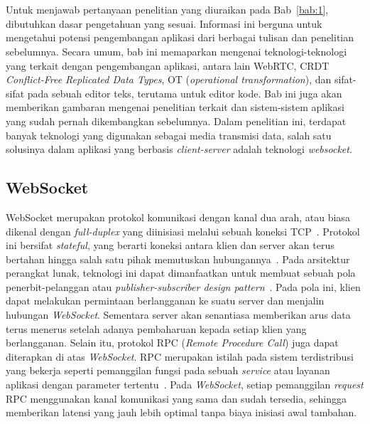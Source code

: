 \chapter{\babDua}
\label{bab:2}
Untuk menjawab pertanyaan penelitian yang diuraikan pada Bab~\ref{bab:1}, dibutuhkan dasar pengetahuan yang sesuai. Informasi ini berguna untuk mengetahui potensi pengembangan aplikasi dari berbagai tulisan dan penelitian sebelumnya. Secara umum, bab ini memaparkan mengenai teknologi-teknologi yang terkait dengan pengembangan aplikasi, antara lain WebRTC, CRDT \textit{Conflict-Free Replicated Data Types}, OT (\textit{operational transformation}), dan sifat-sifat pada sebuah editor teks, terutama untuk editor kode. Bab ini juga akan memberikan gambaran mengenai penelitian terkait dan sistem-sistem aplikasi yang sudah pernah dikembangkan sebelumnya. Dalam penelitian ini, terdapat banyak teknologi yang digunakan sebagai media transmisi data, salah satu solusinya dalam aplikasi yang berbasis \textit{client-server} adalah teknologi \textit{websocket}.

\section{WebSocket}

WebSocket merupakan protokol komunikasi dengan kanal dua arah, atau biasa dikenal dengan \textit{full-duplex} yang diinisiasi melalui sebuah koneksi TCP~\citep{fette2011websocket}. Protokol ini bersifat \textit{stateful}, yang berarti koneksi antara klien dan server akan terus bertahan hingga salah satu pihak memutuskan hubungannya~\citep{pimentel2012communicating}. Pada arsitektur perangkat lunak, teknologi ini dapat dimanfaatkan untuk membuat sebuah pola penerbit-pelanggan atau \textit{publisher-subscriber design pattern}~\citep{ganaputra2015asynchronous}. Pada pola ini, klien dapat melakukan permintaan berlangganan ke suatu server dan menjalin hubungan \textit{WebSocket}. Sementara server akan senantiasa memberikan arus data terus menerus setelah adanya pembaharuan kepada setiap klien yang berlangganan. Selain itu, protokol RPC (\textit{Remote Procedure Call}) juga dapat diterapkan di atas \textit{WebSocket}. RPC merupakan istilah pada sistem terdistribusi yang bekerja seperti pemanggilan fungsi pada sebuah \textit{service} atau layanan aplikasi dengan parameter tertentu~\citep{srinivasan1995rpc}. Pada \textit{WebSocket}, setiap pemanggilan \textit{request} RPC menggunakan kanal komunikasi yang sama dan sudah tersedia, sehingga memberikan latensi yang jauh lebih optimal tanpa biaya inisiasi awal tambahan.

